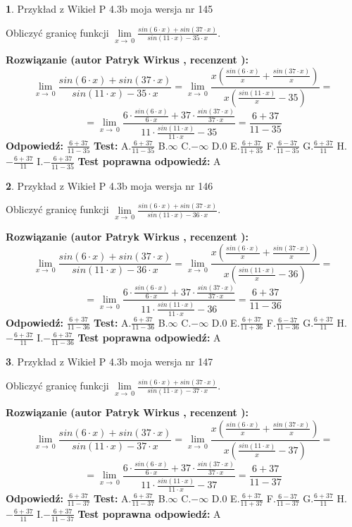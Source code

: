 \documentclass[12pt, a4paper]{article}
\theoremstyle{definition} %
\newtheorem{zad}{}
\newcommand{\zadStart}[1]{\begin{zad}#1\newline}
\newcommand{\zadStop}{\end{zad}}
\newcommand{\rozwStart}[2]{\noindent \textbf{Rozwiązanie (autor #1 , recenzent #2): }\newline}
\newcommand{\rozwStop}{\newline}
\newcommand{\odpStart}{\noindent \textbf{Odpowiedź:}\newline}
\newcommand{\odpStop}{\newline}
\newcommand{\testStart}{\noindent \textbf{Test:}\newline}
\newcommand{\testStop}{\newline}
\newcommand{\kluczStart}{\noindent \textbf{Test poprawna odpowiedź:}\newline}
\newcommand{\kluczStop}{\newline}
\begin{document}
\zadStart{Przykład z Wikieł P 4.3b moja wersja nr 145}


Obliczyć granicę funkcji $\lim\limits_{x\to\ 0}\frac{sin(6 \cdot x)+sin(37 \cdot x)}{sin(11 \cdot x)-35 \cdot x}$.
\zadStop
\rozwStart{Patryk Wirkus}{}
$$\lim\limits_{x\to\ 0}\frac{sin(6 \cdot x)+sin(37 \cdot x)}{sin(11 \cdot x)-35 \cdot x}=\lim\limits_{x\to\ 0}\frac{x(\frac{sin(6 \cdot x)}{x}+\frac{sin(37 \cdot x)}{x})}{x(\frac{sin(11 \cdot x)}{x}-35)}=$$
$$=\lim\limits_{x\to\ 0}\frac{6 \cdot \frac{sin(6 \cdot x)}{6 \cdot x}+37 \cdot \frac{sin(37 \cdot x)}{37 \cdot x}}{11 \cdot \frac{sin(11 \cdot x)}{11 \cdot x}-35}=\frac{6+37}{11-35}$$
\rozwStop
\odpStart
$\frac{6+37}{11-35}$
\odpStop
\testStart
A.$\frac{6+37}{11-35}$
B.$\infty$
C.$-\infty$
D.$0$
E.$\frac{6+37}{11+35}$
F.$\frac{6-37}{11-35}$
G.$\frac{6+37}{11}$
H.$-\frac{6+37}{11}$
I.$-\frac{6+37}{11-35}$
\testStop
\kluczStart
A
\kluczStop



\zadStart{Przykład z Wikieł P 4.3b moja wersja nr 146}


Obliczyć granicę funkcji $\lim\limits_{x\to\ 0}\frac{sin(6 \cdot x)+sin(37 \cdot x)}{sin(11 \cdot x)-36 \cdot x}$.
\zadStop
\rozwStart{Patryk Wirkus}{}
$$\lim\limits_{x\to\ 0}\frac{sin(6 \cdot x)+sin(37 \cdot x)}{sin(11 \cdot x)-36 \cdot x}=\lim\limits_{x\to\ 0}\frac{x(\frac{sin(6 \cdot x)}{x}+\frac{sin(37 \cdot x)}{x})}{x(\frac{sin(11 \cdot x)}{x}-36)}=$$
$$=\lim\limits_{x\to\ 0}\frac{6 \cdot \frac{sin(6 \cdot x)}{6 \cdot x}+37 \cdot \frac{sin(37 \cdot x)}{37 \cdot x}}{11 \cdot \frac{sin(11 \cdot x)}{11 \cdot x}-36}=\frac{6+37}{11-36}$$
\rozwStop
\odpStart
$\frac{6+37}{11-36}$
\odpStop
\testStart
A.$\frac{6+37}{11-36}$
B.$\infty$
C.$-\infty$
D.$0$
E.$\frac{6+37}{11+36}$
F.$\frac{6-37}{11-36}$
G.$\frac{6+37}{11}$
H.$-\frac{6+37}{11}$
I.$-\frac{6+37}{11-36}$
\testStop
\kluczStart
A
\kluczStop



\zadStart{Przykład z Wikieł P 4.3b moja wersja nr 147}


Obliczyć granicę funkcji $\lim\limits_{x\to\ 0}\frac{sin(6 \cdot x)+sin(37 \cdot x)}{sin(11 \cdot x)-37 \cdot x}$.
\zadStop
\rozwStart{Patryk Wirkus}{}
$$\lim\limits_{x\to\ 0}\frac{sin(6 \cdot x)+sin(37 \cdot x)}{sin(11 \cdot x)-37 \cdot x}=\lim\limits_{x\to\ 0}\frac{x(\frac{sin(6 \cdot x)}{x}+\frac{sin(37 \cdot x)}{x})}{x(\frac{sin(11 \cdot x)}{x}-37)}=$$
$$=\lim\limits_{x\to\ 0}\frac{6 \cdot \frac{sin(6 \cdot x)}{6 \cdot x}+37 \cdot \frac{sin(37 \cdot x)}{37 \cdot x}}{11 \cdot \frac{sin(11 \cdot x)}{11 \cdot x}-37}=\frac{6+37}{11-37}$$
\rozwStop
\odpStart
$\frac{6+37}{11-37}$
\odpStop
\testStart
A.$\frac{6+37}{11-37}$
B.$\infty$
C.$-\infty$
D.$0$
E.$\frac{6+37}{11+37}$
F.$\frac{6-37}{11-37}$
G.$\frac{6+37}{11}$
H.$-\frac{6+37}{11}$
I.$-\frac{6+37}{11-37}$
\testStop
\kluczStart
A
\kluczStop
\end{document}
